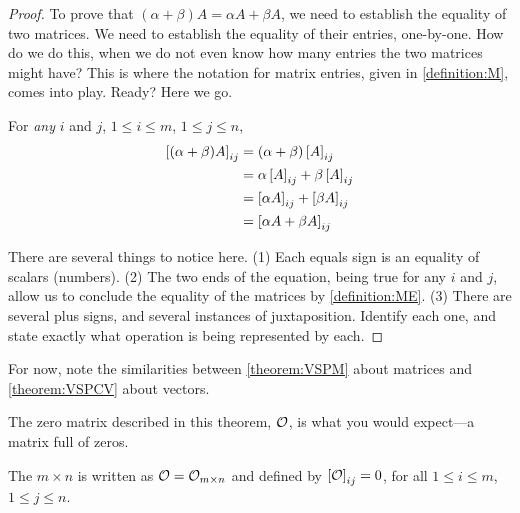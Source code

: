 \documentclass{ximera}
\begin{document}
\begin{theorem}
\begin{proof}
  To prove that $(\alpha+\beta)A=\alpha A+\beta A$, we need to
  establish the equality of two matrices.  We need to establish the
  equality of their entries, one-by-one.  How do we do this, when we
  do not even know how many entries the two matrices might have?  This
  is where the notation for matrix entries, given in
  \ref{definition:M}, comes into play.  Ready?  Here we go.

  For \textit{any} $i$ and $j$, $1\leq i\leq m$, $1\leq j\leq n$,
  \begin{align*}
    \matrixentry{(\alpha+\beta)A}{ij}&=
                                       (\alpha+\beta)\matrixentry{A}{ij} \\ %
                                     &=\alpha\matrixentry{A}{ij}+\beta\matrixentry{A}{ij}\\ %
                                     &=\matrixentry{\alpha A}{ij}+\matrixentry{\beta A}{ij}\\ %
                                     &=\matrixentry{\alpha A+\beta A}{ij}\\ %
  \end{align*}

  There are several things to notice here.  (1) Each equals sign is an
  equality of scalars (numbers).  (2) The two ends of the equation,
  being true for any $i$ and $j$, allow us to conclude the equality of
  the matrices by \ref{definition:ME}.  (3) There are several plus
  signs, and several instances of juxtaposition.  Identify each one,
  and state exactly what operation is being represented by each.
\end{proof}
\end{theorem}

For now, note the similarities between \ref{theorem:VSPM} about matrices and \ref{theorem:VSPCV} about vectors.

The zero matrix described in this theorem, $\mathcal{O}$, is what you would expect---a matrix full of zeros.

\begin{definition}
  The $m\times n$  is written as
  $\mathcal{O}=\mathcal{O}_{m\times n}$ and defined by
  $\left\lbrack\mathcal{O}\right\rbrack_{ij}=0$, for all $1\leq i\leq m$,
  $1\leq j\leq n$.
\end{definition}
\end{document}
